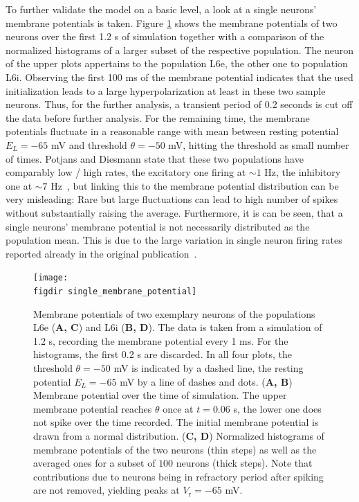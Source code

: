 To further validate the model on a basic level, a look at a single neurons' membrane potentials 
is taken. Figure \ref{fig:single_membrane_potential} shows the membrane 
potentials of two neurons over the first 1.2 s of simulation together with a comparison of
the normalized histograms of a larger subset of the 
respective population. The neuron of the upper plots appertains to the population
L6e, the other one to population L6i. 
Observing the first 100 ms of the membrane potential 
indicates that the used initialization leads to a large hyperpolarization at least in these two 
sample neurons. Thus, for the further analysis, a transient period of 0.2 seconds is cut off the
data before further analysis. For the remaining time, the membrane potentials fluctuate 
in a reasonable range with mean between resting potential $E_L = -65$ mV and threshold $\theta = -50$ mV, 
hitting the threshold as small number of times. 
Potjans and Diesmann state that
these two populations have comparably low / high rates, the excitatory one firing at 
$\sim 1$ Hz, the inhibitory one at $\sim 7$ Hz~\cite{potjans2014}, 
but linking this to the membrane potential distribution can be very misleading:
Rare but large fluctuations can lead to high number of spikes without substantially 
raising the average. 
Furthermore, it is can be seen, that a single 
neurons' membrane potential is not necessarily distributed as the population mean. 
This is due to the large variation in single neuron firing rates reported already in the 
original publication~\cite{potjans2014}. 

\begin{figure}[tb]
    \centering
    \texttt{[image: \\figdir single\_membrane\_potential]}
    \caption[Exemplary membrane potentials]{
        Membrane potentials of two exemplary neurons of the populations 
        L6e (\textbf{A, C}) and L6i (\textbf{B, D}). The data is taken from 
        a simulation of 1.2 s, recording the membrane potential every 1 ms.
        For the histograms, the first 0.2 s are discarded. 
        In all four plots, the threshold $\theta = -50$ mV is indicated by a dashed line, 
        the resting potential $E_L = -65$ mV by a line of dashes and dots. 
        \quad (\textbf{A, B}) Membrane potential over the time of simulation. 
        The upper membrane potential reaches $\theta$ once at $t = 0.06$ s, 
        the lower one does not spike over the time recorded. 
        The initial membrane potential 
        is drawn from a normal distribution.
        \quad (\textbf{C, D}) Normalized histograms of membrane potentials of the
        two neurons (thin steps) as well as the averaged ones for a subset of $100$ 
        neurons (thick steps). 
        Note that contributions due to neurons being in refractory 
        period after spiking are not removed, yielding peaks at $V_\text{r} = -65$ mV. 
    }
    \label{fig:single_membrane_potential}
\end{figure}



